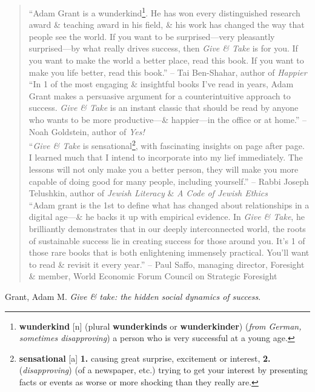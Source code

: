 \documentclass[oneside]{book}
\numberwithin{equation}{section}
\begin{document}
\begin{quotation}
	``Adam Grant is a wunderkind\footnote{\textbf{wunderkind} [n] (plural \textbf{wunderkinds} or \textbf{wunderkinder}) (\textit{from German, sometimes disapproving}) a person who is very successful at a young age.}. He has won every distinguished research award \& teaching award in his field, \& his work has changed the way that people see the world. If you want to be surprised---very pleasantly surprised---by what really drives success, then \textit{Give \& Take} is for you. If you want to make the world a better place, read this book. If you want to make you life better, read this book.'' -- Tai Ben-Shahar, author of \textit{Happier}\\
	
	``In 1 of the most engaging \& insightful books I've read in years, Adam Grant makes a persuasive argument for a counterintuitive approach to success. \textit{Give \& Take} is an instant classic that should be read by anyone who wants to be more productive---\& happier---in the office or at home.'' -- Noah Goldstein, author of \textit{Yes!}\\
	
	``\textit{Give \& Take} is sensational\footnote{\textbf{sensational} [a] \textbf{1.} causing great surprise, excitement or interest, \textbf{2.} (\textit{disapproving}) (of a newspaper, etc.) trying to get your interest by presenting facts or events as worse or more shocking than they really are.}, with fascinating insights on page after page. I learned much that I intend to incorporate into my lief immediately. The lessons will not only make you a better person, they will make you more capable of doing good for many people, including yourself.'' -- Rabbi Joseph Telushkin, author of \textit{Jewish Literacy} \& \textit{A Code of Jewish Ethics}\\
	
	``Adam grant is the 1st to define what has changed about relationships in a digital age---\& he backs it up with empirical evidence. In \textit{Give \& Take}, he brilliantly demonstrates that in our deeply interconnected world, the roots of sustainable success lie in creating success for those around you. It's 1 of those rare books that is both enlightening immensely practical. You'll want to read \& revisit it every year.'' -- Paul Saffo, managing director, Foresight \& member, World Economic Forum Council on Strategic Foresight
\end{quotation}
Grant, Adam M. \textit{Give \& take: the hidden social dynamics of success}.
\end{document}
